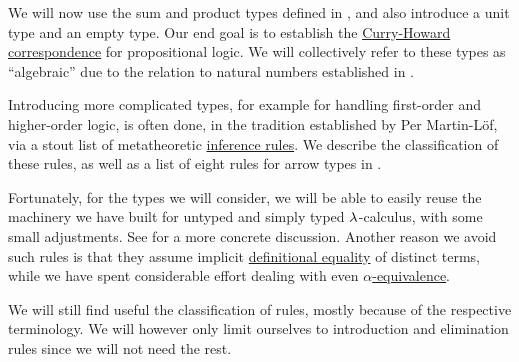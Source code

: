 \begin{remark}\label{rem:extended_simple_type_theory}
  We will now use the sum and product types defined in , and also introduce a unit type and an empty type. Our end goal is to establish the \hyperref[con:curry_howard_correspondence]{Curry-Howard correspondence} for propositional logic. We will collectively refer to these types as \enquote{algebraic} due to the relation to natural numbers established in .

  Introducing more complicated types, for example for handling first-order and higher-order logic, is often done, in the tradition established by Per Martin-L\"of, via a stout list of metatheoretic \hyperref[def:inference_rule]{inference rules}. We describe the classification of these rules, as well as a list of eight rules for arrow types in .

  Fortunately, for the types we will consider, we will be able to easily reuse the machinery we have built for untyped and simply typed \( \mathrm{\lambda} \)-calculus, with some small adjustments. See  for a more concrete discussion. Another reason we avoid such rules is that they assume implicit \hyperref[con:equality]{definitional equality} of distinct terms, while we have spent considerable effort dealing with even \hyperref[def:lambda_term_alpha_equivalence]{\( \alpha \)-equivalence}.

  We will still find useful the classification of rules, mostly because of the respective terminology. We will however only limit ourselves to introduction and elimination rules since we will not need the rest.
\end{remark}

